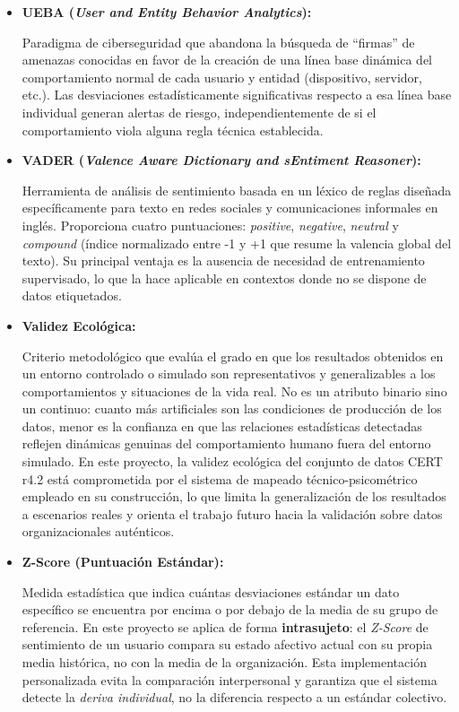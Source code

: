\documentclass[IB]{TFUOC}%
\begin{document}
\begin{itemize}
    \item \textbf{UEBA (\textit{User and Entity Behavior Analytics}):}
    
    Paradigma de ciberseguridad que abandona la búsqueda de ``firmas'' de amenazas conocidas en favor de la creación de una línea base dinámica del comportamiento normal de cada usuario y entidad (dispositivo, servidor, etc.). Las desviaciones estadísticamente significativas respecto a esa línea base individual generan alertas de riesgo, independientemente de si el comportamiento viola alguna regla técnica establecida.

    \item \textbf{VADER (\textit{Valence Aware Dictionary and sEntiment Reasoner}):}
    
    Herramienta de análisis de sentimiento basada en un léxico de reglas diseñada específicamente para texto en redes sociales y comunicaciones informales en inglés. Proporciona cuatro puntuaciones: \textit{positive}, \textit{negative}, \textit{neutral} y \textit{compound} (índice normalizado entre -1 y +1 que resume la valencia global del texto). Su principal ventaja es la ausencia de necesidad de entrenamiento supervisado, lo que la hace aplicable en contextos donde no se dispone de datos etiquetados.

    \item \textbf{Validez Ecológica:}
    
    Criterio metodológico que evalúa el grado en que los resultados obtenidos en un entorno controlado o simulado son representativos y generalizables a los comportamientos y situaciones de la vida real. No es un atributo binario sino un continuo: cuanto más artificiales son las condiciones de producción de los datos, menor es la confianza en que las relaciones estadísticas detectadas reflejen dinámicas genuinas del comportamiento humano fuera del entorno simulado. En este proyecto, la validez ecológica del conjunto de datos CERT r4.2 está comprometida por el sistema de mapeado técnico-psicométrico empleado en su construcción, lo que limita la generalización de los resultados a escenarios reales y orienta el trabajo futuro hacia la validación sobre datos organizacionales auténticos.

    \item \textbf{Z-Score (Puntuación Estándar):}
    
    Medida estadística que indica cuántas desviaciones estándar un dato específico se encuentra por encima o por debajo de la media de su grupo de referencia. En este proyecto se aplica de forma \textbf{intrasujeto}: el \textit{Z-Score} de sentimiento de un usuario compara su estado afectivo actual con su propia media histórica, no con la media de la organización. Esta implementación personalizada evita la comparación interpersonal y garantiza que el sistema detecte la \textit{deriva individual}, no la diferencia respecto a un estándar colectivo.

\end{itemize}
\end{document}
